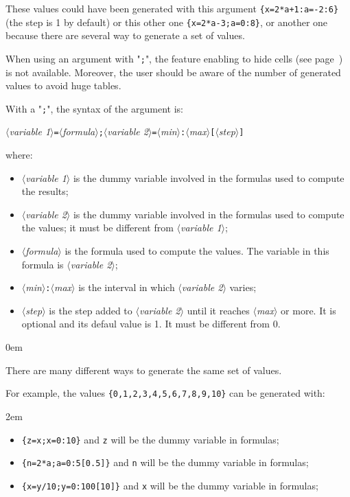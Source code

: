 \documentclass[a4paper,10pt]{article}
\newcommand\argu[1]{$\langle$\textit{#1}$\rangle$}
\newcommand\arguC[1]{\texttt{[}\argu{#1}\texttt{]}}
\begin{document}
These values could have been generated with this argument \verb|{x=2*a+1:a=-2:6}| (the step is 1 by default) or this other one \verb|{x=2*a-3;a=0:8}|, or another one because there are several way to generate a set of values.\bigskip

When using an argument with "\verb=;=", the feature enabling to hide cells (see page~\pageref{masquercellules}) is not available. Moreover, the user should be aware of the number of generated values to avoid huge tables.\medskip

With a "\verb=;=", the syntax of the argument is:\par\smallskip\nobreak
\hfill\argu{variable 1}\verb|=|\argu{formula}\verb|;|\argu{variable 2}\verb|=|\argu{min}\verb|:|\argu{max}\arguC{step}\hfill{}\smallskip

where:
\begin{itemize}
	\item \argu{variable 1} is the dummy variable involved in the formulas used to compute the results;
	\item \argu{variable 2} is the dummy variable involved in the formulas used to compute the values; it must be different from \argu{variable 1};
	\item \argu{formula} is the formula used to compute the values. The variable in this formula is \argu{variable 2};
	\item \argu{min}\verb|:|\argu{max} is the interval in which \argu{variable 2} varies;
	\item \argu{step} is the step added to \argu{variable 2} until it reaches \argu{max} or more. It is optional and its defaul value is 1. It must be different from 0.
\end{itemize}\parindent0em
\medskip

There are many different ways to generate the same set of values.

For example, the values \texttt{\{0,1,2,3,4,5,6,7,8,9,10\}} can be generated with:

\parindent2em
\begin{itemize}
	\item \verb|{z=x;x=0:10}| and \og\verb=z=\fg{} will be the dummy variable in formulas;
	\item \verb|{n=2*a;a=0:5[0.5]}| and \og\verb=n=\fg{} will be the dummy variable in formulas;
	\item \verb|{x=y/10;y=0:100[10]}| and \og\verb=x=\fg{} will be the dummy variable in formulas;
\end{itemize}
\parindent0pt\medskip
\end{document}
